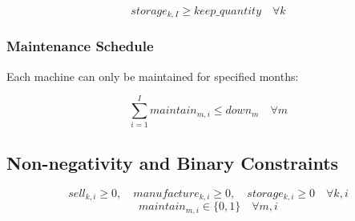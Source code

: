 \documentclass{article}
\begin{document}
\[
storage_{k,I} \geq keep\_quantity \quad \forall k
\]

\subsubsection*{Maintenance Schedule}
Each machine can only be maintained for specified months:

\[
\sum_{i=1}^{I} maintain_{m,i} \leq down_m \quad \forall m
\]

\subsection*{Non-negativity and Binary Constraints}
\[
sell_{k,i} \geq 0, \quad manufacture_{k,i} \geq 0, \quad storage_{k,i} \geq 0 \quad \forall k,i
\]
\[
maintain_{m,i} \in \{0, 1\} \quad \forall m,i
\]
\end{document}
